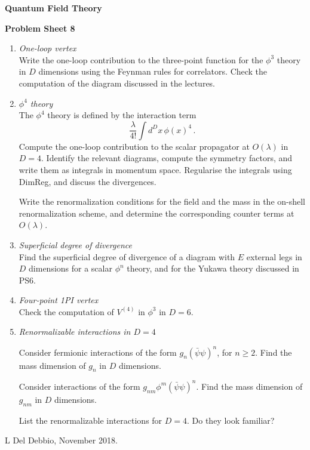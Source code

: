 \documentclass[12pt,a4paper]{article}
\newcommand{\psibar}{\bar{\psi}}
\begin{document}
\begin{center}
{\bf Quantum Field Theory}\\[\baselineskip]
\end{center}
{\bf Problem Sheet 8}

\begin{enumerate}
\item {\it One-loop vertex} \\

  Write the one-loop contribution to the three-point function for the
  $\phi^3$ theory in $D$ dimensions using the Feynman rules for
  correlators. Check the computation of the diagram discussed in the
  lectures. 
  
  \bigskip
  
\item {\it $\phi^4$ theory}\\

  The $\phi^4$ theory is defined by the interaction term
  \[
    \frac{\lambda}{4!} \int d^Dx\, \phi(x)^4\, .
  \]
  Compute the one-loop contribution to the scalar propagator at
  $O(\lambda)$ in $D=4$. Identify the relevant diagrams, compute the symmetry
  factors, and write them as integrals in momentum space. Regularise
  the integrals using DimReg, and discuss the divergences.

  Write the renormalization conditions for the field and the mass in
  the on-shell renormalization scheme, and determine the corresponding
  counter terms at $O(\lambda)$.
  
  \bigskip

\item {\it Superficial degree of  divergence}\\

  Find the superficial degree of divergence of a diagram with $E$
  external legs in $D$ dimensions for a scalar $\phi^n$ theory, and for
  the Yukawa theory discussed in PS6.

  \bigskip 
  
\item {\it Four-point 1PI vertex}\\
  
  Check the computation of $V^{(4)}$ in $\phi^3$ in $D=6$.
  
  \bigskip
  
\item {\it Renormalizable interactions in $D=4$}
  
  Consider fermionic interactions of the form $g_n (\psibar\psi)^n$,
  for $n \geq 2$. Find the mass dimension of $g_n$ in $D$ dimensions.
  
  Consider interactions of the form $g_{nm} \phi^m
  (\psibar\psi)^n$. Find the mass dimension of $g_{nm}$ in $D$
  dimensions.
  
  List the renormalizable interactions for $D=4$. Do they look
  familiar? 
  
\end{enumerate}

\vfill
\hspace*{\fill}\tiny L Del Debbio, November 2018.
\end{document}
